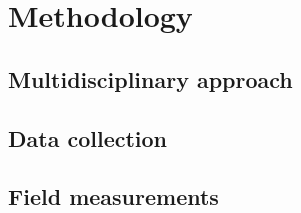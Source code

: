 \chapter{Methodology}

\section{Multidisciplinary approach}

\section{Data collection}

\section{Field measurements}